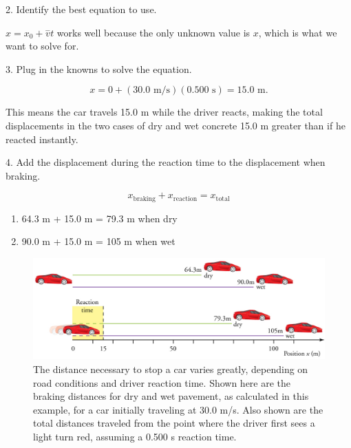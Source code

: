 \documentclass[
]{book}
\providecommand{\tightlist}{%
  \setlength{\itemsep}{0pt}\setlength{\parskip}{0pt}}
\begin{document}
2. Identify the best equation to use.

\({{x = {x_{0} + \overset{-}{v}}}t}{}\) works well because the only
unknown value is \(x{}\), which is what we want to solve for.

3. Plug in the knowns to solve the equation.

\leavevmode{}%
\[{{{x = {0 + \left( {\text{30}\text{.}\text{0\ m/s}} \right)}}{\left( {0\text{.}\text{500\ s}} \right) = \text{15}}\text{.}\text{0\ m}}.}{}\]

This means the car travels 15.0 m while the driver reacts, making the
total displacements in the two cases of dry and wet concrete 15.0 m
greater than if he reacted instantly.

4. Add the displacement during the reaction time to the displacement
when braking.

\leavevmode{}%
\[{{x_{\text{braking}} + x_{\text{reaction}}} = x_{\text{total}}}{}\]

\begin{enumerate}
\def\labelenumi{\alph{enumi}.}
\tightlist
\item
  \protect\hypertarget{import-auto-id1658854}{}{64.3 m + 15.0 m = 79.3 m when dry}
\item
  \protect\hypertarget{import-auto-id1658828}{}{90.0 m + 15.0 m = 105 m when wet}
\end{enumerate}

\begin{figure}
\hypertarget{import-auto-id1658840}{%
\centering
\includegraphics{images/Figure_02_04_03.jpg}
\caption{The distance necessary to stop a car varies greatly, depending on road
conditions and driver reaction time. Shown here are the braking
distances for dry and wet pavement, as calculated in this example, for a
car initially traveling at 30.0 m/s. Also shown are the total distances
traveled from the point where the driver first sees a light turn red,
assuming a 0.500 s reaction
time.}\label{import-auto-id1658840}
}
\end{figure}
\end{document}
